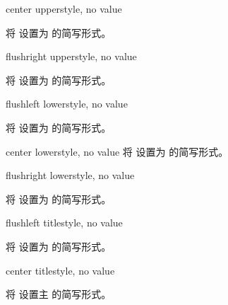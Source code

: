   \begin{docTcbKey}[][doc updated=2015-05-07]{center upper}{}{style, no value}
  
  将  设置为  的简写形式。
  \end{docTcbKey}
  
  \begin{docTcbKey}[][doc updated=2015-05-07]{flushright upper}{}{style, no value}
  
  将  设置为  的简写形式。
  \end{docTcbKey}
  
  \begin{docTcbKey}[][doc updated=2015-05-07]{flushleft lower}{}{style, no value}
  
  将  设置为  的简写形式。
  \end{docTcbKey}
  
  \begin{docTcbKey}[][doc updated=2015-05-07]{center lower}{}{style, no value}
  将  设置为  的简写形式。
  \end{docTcbKey}
  
  \begin{docTcbKey}[][doc updated=2015-05-07]{flushright lower}{}{style, no value}
  
  将  设置为  的简写形式。
  \end{docTcbKey}

  


\begin{docTcbKey}[][doc updated=2015-05-07]{flushleft title}{}{style, no value}
  
  将  设置为  的简写形式。
  \end{docTcbKey}
  
  \begin{docTcbKey}[][doc updated=2015-05-07]{center title}{}{style, no value}
  
  将  设置主  的简写形式。
  \end{docTcbKey}
  
